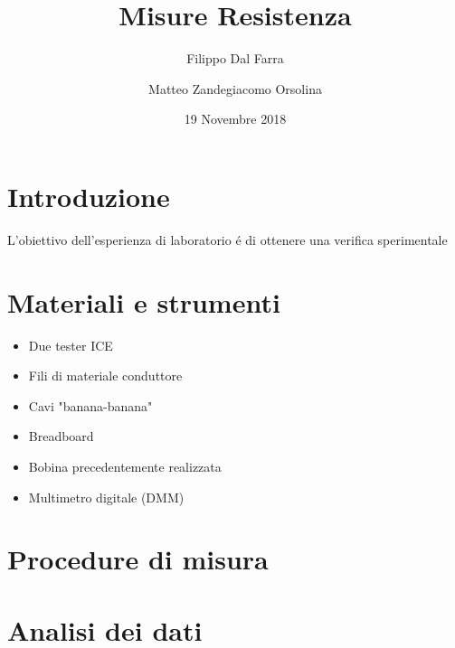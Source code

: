 \documentclass{article}
\title{Misure Resistenza}
\author{Filippo Dal Farra \and Matteo Zandegiacomo Orsolina}
\date{19 Novembre 2018}
\begin{document}
\maketitle

\newpage

\section{Introduzione}
L'obiettivo dell'esperienza di laboratorio \'e di ottenere una verifica sperimentale\\
\lipsum[1-2]
\newpage

\section{Materiali e strumenti}

\begin{itemize}
  \item Due tester ICE
  \item Fili di materiale conduttore
  \item Cavi "banana-banana"
  \item Breadboard
  \item Bobina precedentemente realizzata
  \item Multimetro digitale (DMM)
\end{itemize}

\newpage

\section{Procedure di misura}
\lipsum[1-2]

\newpage


\section{Analisi dei dati}
\end{document}

